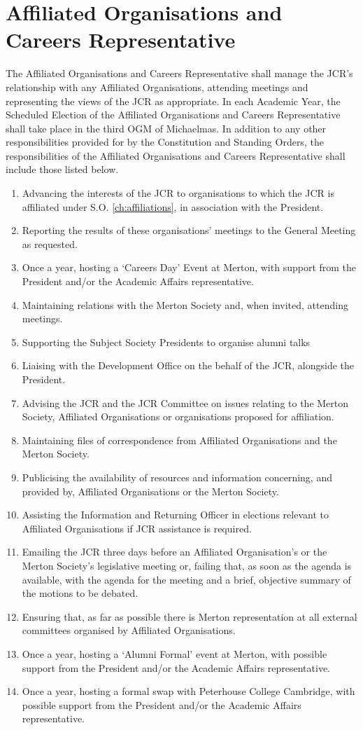 \section{Affiliated Organisations and Careers Representative}
\npara The Affiliated Organisations and Careers Representative shall manage the JCR's relationship with any Affiliated Organisations, attending meetings and representing the views of the JCR as appropriate.
\npara In each Academic Year, the Scheduled Election of the Affiliated Organisations and Careers Representative shall take place in the third OGM of Michaelmas.
\npara In addition to any other responsibilities provided for by the Constitution and Standing Orders, the responsibilities of the Affiliated Organisations and Careers Representative shall include those listed below.
\begin{enumerate}
	\item Advancing the interests of the JCR to organisations to which the JCR is affiliated under S.O. \ref{ch:affiliations}, in association with the President.     
	\item Reporting the results of these organisations' meetings to the General Meeting as requested.
	\item Once a year, hosting a `Careers Day' Event at Merton, with support from the President and/or the Academic Affairs representative.
	\item Maintaining relations with the Merton Society and, when invited, attending meetings.
	\item Supporting the Subject Society Presidents to organise alumni talks
	\item Liaising with the Development Office on the behalf of the JCR, alongside the President.
	\item Advising the JCR and the JCR Committee on issues relating to the Merton Society, Affiliated Organisations or organisations proposed for affiliation.
	\item Maintaining files of correspondence from Affiliated Organisations and the Merton Society.
	\item Publicising the availability of resources and information concerning, and provided by, Affiliated Organisations or the Merton Society.
	\item Assisting the Information and Returning Officer in elections relevant to Affiliated Organisations if JCR assistance is required.
	\item Emailing the JCR three days before an Affiliated Organisation's or the Merton Society's legislative meeting or, failing that, as soon as the agenda is available, with the agenda for the meeting and a brief, objective summary of the motions to be debated.
	\item Ensuring that, as far as possible there is Merton representation at all external committees organised by Affiliated Organisations.
	\item Once a year, hosting a ‘Alumni Formal’ event at Merton, with possible support from the President and/or the Academic Affairs representative.
	\item Once a year, hosting a formal swap with Peterhouse College Cambridge, with possible support from the President and/or the Academic Affairs representative.
\end{enumerate}
